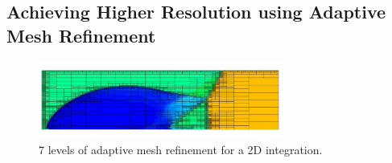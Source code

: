 \subsection{Achieving Higher Resolution using Adaptive Mesh Refinement}


\begin{figure}[t]
\centering
\includegraphics[width=8cm]{amr_demo}
\caption{7 levels of adaptive mesh refinement for a 2D integration.
}
\label{fig:3-7} %
\end{figure}

